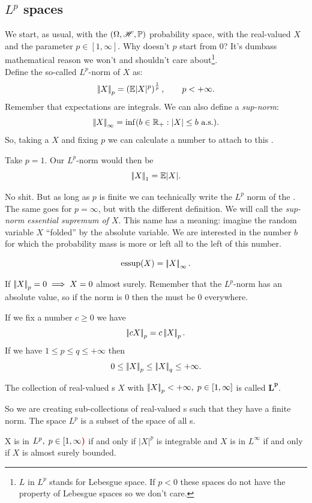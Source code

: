 \documentclass{report}
\begin{document}
\subsection{$L^p$ spaces}
We start, as usual, with the $(\Omega,\mathscr{H},\mathbb{P})$ probability space, with the real-valued \rv{} $X$ and the parameter $p\in[1,\infty]$. Why doesn't $p$ start from 0? It's dumbass mathematical reason we won't and shouldn't care about\footnote{$L$ in $L^p$ stands for Lebesgue space. If $p<0$ these spaces do not have the property of Lebesgue spaces so we don't care.}.\\
Define the so-called $L^p$-norm of $X$ as:
\[\left|\negthinspace\left|X\right|\negthinspace\right|_p=\left(\mathbb{E}|X|^p\right)^{\frac{1}{p}},\qquad p<+\infty.\]
Remember that expectations are integrals. We can also define a \textit{sup-norm}:
\[\left|\negthinspace\left|X\right|\negthinspace\right|_{\infty}=\inf(b\in\mathbb{R}_+:|X|\leq b\text{ a.s.}).\]
So, taking a \rv{} $X$ and fixing $p$ we can calculate a number to attach to this \rv{}.
\begin{example}
	Take $p=1$. Our $L^p$-norm would then be
	\[\left|\negthinspace\left|X\right|\negthinspace\right|_1=\mathbb{E}|X|.\]
\end{example}
No shit. But as long as $p$ is finite we can technically write the $L^p$ norm of the \rv. The same goes for $p=\infty$, but with the different definition. We will call the \textit{sup-norm} \emph{essential supremum of $X$}. This name has a meaning: imagine the random variable $X$ ``folded'' by the absolute variable. We are interested in the number $b$ for which the probability mass is more or left all to the left of this number.
\begin{notation}
	\[ \mathrm{essup}(X)= \left|\negthinspace\left|X\right|\negthinspace\right|_{\infty}.\]
\end{notation}
\begin{remark}
	If $\left|\negthinspace\left|X\right|\negthinspace\right|_p=0\implies X=0$ almost surely. Remember that the $L^p$-norm has an absolute value, so if the norm is 0 then the \rv{} must be 0 everywhere. 
\end{remark}
If we fix a number $c\geq0$ we have
\[\left|\negthinspace\left|cX\right|\negthinspace\right|_p=c\left|\negthinspace\left|X\right|\negthinspace\right|_p.\]
If we have $1\leq p\leq q\leq+\infty$ then
\[0\leq\left|\negthinspace\left|X\right|\negthinspace\right|_p\leq\left|\negthinspace\left|X\right|\negthinspace\right|_q\leq+\infty.\]
\begin{definition}
	The collection of real-valued \rv{}s $X$ with $\left|\negthinspace\left|X\right|\negthinspace\right|_p<+\infty,\;p\in[1,\infty]$ is called \emph{$\mathbf{L^p}$}.
\end{definition}
So we are creating sub-collections of real-valued \rv s such that they have a finite norm. The space $L^p$ is a subset of the space of all \rv s.
\begin{remark}
	X is in $L^{p},\;p \in [1,\infty\color{red}\boldsymbol{)}$ if and only if $|X|^{p}$ is integrable and $X$ is in $L^{\infty}$ if and only if $X$ is almost surely bounded.
\end{remark}
\end{document}
